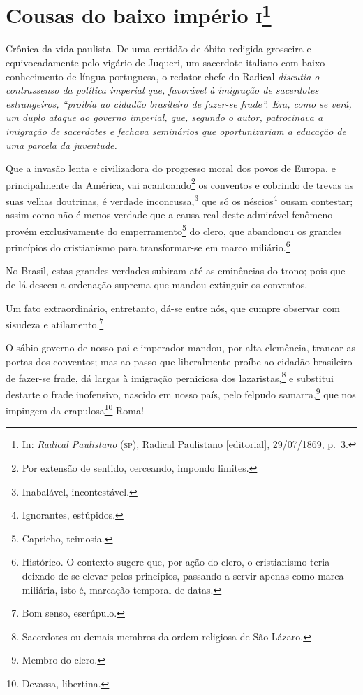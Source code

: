 \chapter{Cousas do baixo império \textsc{i}\footnote{In: \emph{Radical
  Paulistano} (\textsc{sp}), Radical Paulistano {[}editorial{]}, 29/07/1869,
  p.~3.}}

\begin{didascalia}
Crônica da vida paulista. De uma certidão de óbito redigida grosseira e
equivocadamente pelo vigário de Juqueri, um sacerdote italiano com baixo
conhecimento de língua portuguesa, o redator-chefe do Radical
\emph{discutia o contrassenso da política imperial que, favorável à
imigração de sacerdotes estrangeiros, ``proibía ao cidadão
brasileiro de fazer-se frade''. Era, como se verá, um duplo ataque ao
governo imperial, que, segundo o autor, patrocinava a imigração de
sacerdotes e fechava seminários que oportunizariam a educação de uma
parcela da juventude.}
\end{didascalia}



Que a invasão lenta e civilizadora do progresso moral dos povos de
Europa, e principalmente da América, vai acantoando\footnote{Por
  extensão de sentido, cerceando, impondo limites.} os conventos e
cobrindo de trevas as suas velhas doutrinas, é verdade
inconcussa,\footnote{Inabalável, incontestável.} que só os
néscios\footnote{Ignorantes, estúpidos.} ousam contestar; assim como
não é menos verdade que a causa real deste admirável fenômeno provém
exclusivamente do emperramento\footnote{Capricho, teimosia.} do clero,
que abandonou os grandes princípios do cristianismo para transformar-se
em marco miliário.\footnote{Histórico. O contexto sugere que, por ação
  do clero, o cristianismo teria deixado de se elevar pelos princípios,
  passando a servir apenas como marca miliária, isto é, marcação
  temporal de datas.}

No Brasil, estas grandes verdades subiram até as eminências do trono;
pois que de lá desceu a ordenação suprema que mandou extinguir os
conventos.

Um fato extraordinário, entretanto, dá-se entre nós, que cumpre observar
com sisudeza e atilamento.\footnote{Bom senso, escrúpulo.}

O sábio governo de nosso pai e imperador mandou, por alta clemência,
trancar as portas dos conventos; mas ao passo que liberalmente proíbe ao
cidadão brasileiro de fazer-se frade, dá largas à imigração perniciosa
dos lazaristas,\footnote{Sacerdotes ou demais membros da ordem
  religiosa de São Lázaro.} e substitui destarte o frade inofensivo,
nascido em nosso país, pelo felpudo samarra,\footnote{Membro do clero.}
que nos impingem da crapulosa\footnote{Devassa, libertina.} Roma!

